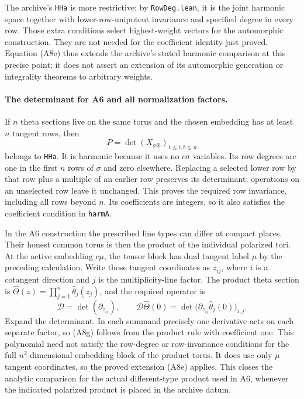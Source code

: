 \documentclass[11pt]{article}
\theoremstyle{definition}\newtheorem{definition}[theorem]{Definition}\newtheorem{remark}[theorem]{Remark}
\begin{document}
The archive's \texttt{HHa} is more restrictive: by
\texttt{RowDeg.lean}, it is the joint harmonic space together with
lower-row-unipotent invariance and specified degree in every row.
Those extra conditions select highest-weight vectors for the
automorphic construction.  They are not needed for the
coefficient identity just proved.  Equation (A8e) thus extends the
archive's stated harmonic comparison at this precise point; it
does not assert an extension of its automorphic generation or
integrality theorems to arbitrary weights.

\paragraph{The determinant for A6 and all normalization factors.}
If $n$ theta sections live on the same torus and the chosen
embedding has at least $n$ tangent rows, then
\[
       P=\det(X_{\sigma i b})_{1\leq i,b\leq n}
 \tag{A8f}
\]
belongs to \texttt{HHa}.  It is harmonic because it uses no
$c\sigma$ variables.  Its row degrees are one in the first $n$
rows of $\sigma$ and zero elsewhere.  Replacing a selected lower
row by that row plus a multiple of an earlier row preserves its
determinant; operations on an unselected row leave it unchanged.
This proves the required row invariance, including all rows beyond
$n$.  Its coefficients are integers, so it also satisfies the
coefficient condition in \texttt{harmA}.

In the A6 construction the prescribed line types can differ at
compact places.  Their honest common torus is then the product of
the individual polarized tori.  At the active embedding $c\mu$,
the tensor block has dual tangent label $\mu$ by the preceding
calculation.  Write those tangent coordinates as $z_{ij}$, where $i$ is a
cotangent direction and $j$ is the multiplicity-line factor.  The
product theta section is
$\widehat\Theta(z)=\prod_{j=1}^n\widehat\theta_j(z_j)$, and the
required operator is
\[
 \mathcal D=\det(\partial_{z_{ij}}),\qquad
 \mathcal D\widehat\Theta(0)
       =\det\bigl(\partial_{z_{ij}}
                         \widehat\theta_j(0)\bigr)_{i,j}.
 \tag{A8g}
\]
Expand the determinant.  In each summand precisely one derivative
acts on each separate factor, so (A8g) follows from the product
rule with coefficient one.  This polynomial need not satisfy the
row-degree or row-invariance conditions for the full
$n^2$-dimensional embedding block of the product torus.  It does
use only $\mu$ tangent coordinates, so the proved extension (A8e)
applies.  This closes the analytic comparison for the actual
different-type product used in A6, whenever the indicated
polarized product is placed in the archive datum.
\end{document}
